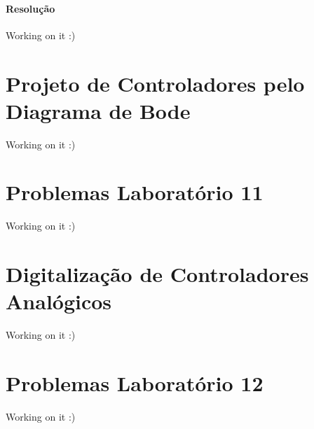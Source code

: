 \documentclass[
]{book}
\theoremstyle{definition}
\theoremstyle{definition}
\theoremstyle{definition}
\theoremstyle{remark}
\begin{document}
\hypertarget{resoluuxe7uxe3o-38}{%
\subsubsection*{Resolução}\label{resoluuxe7uxe3o-38}}

Working on it :)

\hypertarget{projeto-de-controladores-pelo-diagrama-de-bode}{%
\chapter{Projeto de Controladores pelo Diagrama de Bode}\label{projeto-de-controladores-pelo-diagrama-de-bode}}

Working on it :)

\hypertarget{problemas-laboratuxf3rio-11}{%
\chapter*{Problemas Laboratório 11}\label{problemas-laboratuxf3rio-11}}

Working on it :)

\hypertarget{digitalizauxe7uxe3o-de-controladores-analuxf3gicos}{%
\chapter{Digitalização de Controladores Analógicos}\label{digitalizauxe7uxe3o-de-controladores-analuxf3gicos}}

Working on it :)

\hypertarget{problemas-laboratuxf3rio-12}{%
\chapter*{Problemas Laboratório 12}\label{problemas-laboratuxf3rio-12}}

Working on it :)

  
\end{document}
